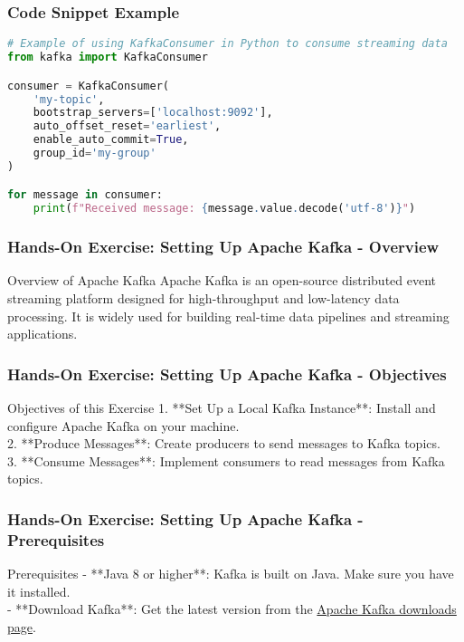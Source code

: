 \documentclass[aspectratio=169]{beamer}
\begin{document}
\begin{frame}[fragile]
    \frametitle{Code Snippet Example}
    \begin{lstlisting}[language=Python]
# Example of using KafkaConsumer in Python to consume streaming data
from kafka import KafkaConsumer

consumer = KafkaConsumer(
    'my-topic',
    bootstrap_servers=['localhost:9092'],
    auto_offset_reset='earliest',
    enable_auto_commit=True,
    group_id='my-group'
)

for message in consumer:
    print(f"Received message: {message.value.decode('utf-8')}")
    \end{lstlisting}
\end{frame}

\begin{frame}[fragile]
    \frametitle{Hands-On Exercise: Setting Up Apache Kafka - Overview}
    \begin{block}{Overview of Apache Kafka}
        Apache Kafka is an open-source distributed event streaming platform designed for high-throughput and low-latency data processing. It is widely used for building real-time data pipelines and streaming applications.
    \end{block}
\end{frame}

\begin{frame}[fragile]
    \frametitle{Hands-On Exercise: Setting Up Apache Kafka - Objectives}
    \begin{block}{Objectives of this Exercise}
        1. **Set Up a Local Kafka Instance**: Install and configure Apache Kafka on your machine. \\
        2. **Produce Messages**: Create producers to send messages to Kafka topics. \\
        3. **Consume Messages**: Implement consumers to read messages from Kafka topics.
    \end{block}
\end{frame}

\begin{frame}[fragile]
    \frametitle{Hands-On Exercise: Setting Up Apache Kafka - Prerequisites}
    \begin{block}{Prerequisites}
        - **Java 8 or higher**: Kafka is built on Java. Make sure you have it installed. \\
        - **Download Kafka**: Get the latest version from the \href{https://kafka.apache.org/downloads}{Apache Kafka downloads page}.
    \end{block}
\end{frame}
\end{document}
